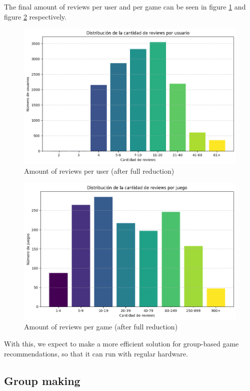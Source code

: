 \documentclass{article}
\begin{document}
The final amount of reviews per user and per game can be seen in figure \ref{fig:reviewsPorUsuarioFinal} and figure \ref{fig:reviewsPorJuegoFinal} respectively.

\begin{figure}[h]
    \centering
    \includegraphics[width=0.8\linewidth]{reviewsPorUsuarioFinal.png}
    \caption{Amount of reviews per user (after full reduction)}
    \label{fig:reviewsPorUsuarioFinal}
\end{figure}

\begin{figure}[h]
    \centering
    \includegraphics[width=0.8\linewidth]{ReviewsPorJuegoFinal.png}
    \caption{Amount of reviews per game (after full reduction)}
    \label{fig:reviewsPorJuegoFinal}
\end{figure}

With this, we expect to make a more efficient solution for group-based game recommendations, so that it can run with regular hardware.

\subsection{Group making}
\end{document}
